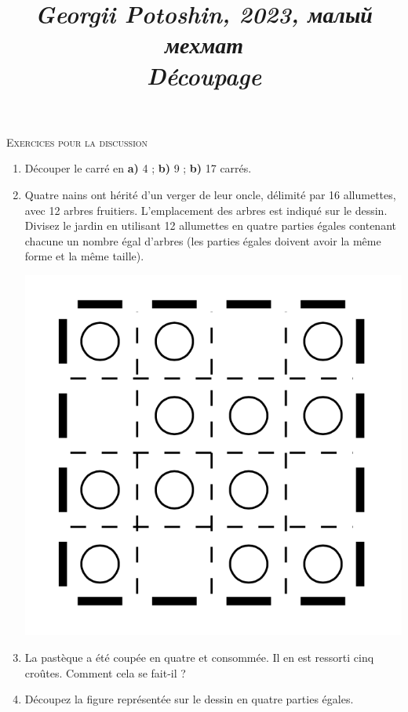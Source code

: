 \documentclass{article}
\title{
\textit{\small{Georgii Potoshin, 2023, малый мехмат}}\\
\vspace{0.3ex}
\textit{\huge{Découpage}}\vspace{1ex}
}
\date{\vspace{-8ex}}
\begin{document}
\maketitle

\begin{center}\textsc{\Large{Exercices pour la discussion}}\end{center}
\begin{enumerate}
    \item Découper le carré en \textbf{a)} 4 ; \textbf{b)} 9 ; \textbf{b)} 17 carrés.
    \item Quatre nains ont hérité d'un verger de leur oncle, délimité par 16 allumettes, avec 12 arbres fruitiers. L'emplacement des arbres est indiqué sur le dessin. Divisez le jardin en utilisant 12 allumettes en quatre parties égales contenant chacune un nombre égal d'arbres (les parties égales doivent avoir la même forme et la même taille).
    \vspace{-3ex}
    \begin{center}
        \includegraphics[scale=0.1]{2.png}        
    \end{center}
    \vspace{-3ex}
    \item La pastèque a été coupée en quatre et consommée. Il en est ressorti cinq croûtes. Comment cela se fait-il ?
    \item Découpez la figure représentée sur le dessin en quatre parties égales.

\end{enumerate}
\end{document}

